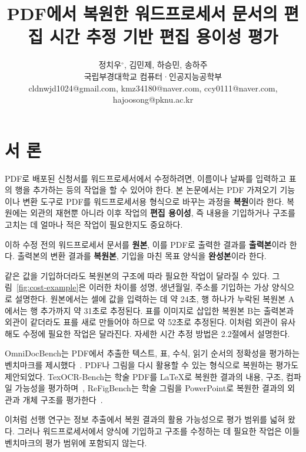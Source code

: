 \documentclass{kcc}
\title{PDF에서 복원한 워드프로세서 문서의 편집 시간 추정 기반 편집 용이성 평가}
\author{
정치우$^{\circ}$, 김민제, 하승민, 송하주\\
국립부경대학교 컴퓨터·인공지능공학부\\
cldnwjd1024@gmail.com, kmz34180@naver.com, ccy0111@naver.com, hajoosong@pknu.ac.kr
}
\begin{document}
\maketitle
\makeatletter
\if@preprint\else
\begingroup
\renewcommand{\thefootnote}{}
\long{}
\endgroup
\fi
\makeatother

\section{서 론}

PDF로 배포된 신청서를 워드프로세서에서 수정하려면, 이름이나 날짜를 입력하고 표의 행을 추가하는 등의 작업을 할 수 있어야 한다.
본 논문에서는 PDF 가져오기 기능이나 변환 도구로 PDF를 워드프로세서용 형식으로 바꾸는 과정을 \textbf{복원}이라 한다.
복원에는 외관의 재현뿐 아니라 이후 작업의 \textbf{편집 용이성}, 즉 내용을 기입하거나 구조를 고치는 데 얼마나 적은 작업이 필요한지도 중요하다.

이하 수정 전의 워드프로세서 문서를 \textbf{원본}, 이를 PDF로 출력한 결과를 \textbf{출력본}이라 한다.
출력본의 변환 결과를 \textbf{복원본}, 기입을 마친 목표 양식을 \textbf{완성본}이라 한다.

같은 값을 기입하더라도 복원본의 구조에 따라 필요한 작업이 달라질 수 있다.
그림~\ref{fig:cost-example}은 이러한 차이를 성명, 생년월일, 주소를 기입하는 가상 양식으로 설명한다.
원본에서는 셀에 값을 입력하는 데 약 24초, 행 하나가 누락된 복원본 A에서는 행 추가까지 약 31초로 추정된다.
표를 이미지로 삽입한 복원본 B는 출력본과 외관이 같더라도 표를 새로 만들어야 하므로 약 52초로 추정된다.
이처럼 외관이 유사해도 수정에 필요한 작업은 달라진다.
자세한 시간 추정 방법은 2.2절에서 설명한다.

{\setlength{\intextsep}{6pt plus 2pt minus 2pt}}

OmniDocBench는 PDF에서 추출한 텍스트, 표, 수식, 읽기 순서의 정확성을 평가하는 벤치마크를 제시했다~\cite{ouyang2025omnidocbench}.
PDF나 그림을 다시 활용할 수 있는 형식으로 복원하는 평가도 제안되었다.
TexOCR-Bench는 학술 PDF를 LaTeX로 복원한 결과의 내용, 구조, 컴파일 가능성을 평가하며~\cite{wang2026texocr}, ReFigBench는 학술 그림을 PowerPoint로 복원한 결과의 외관과 개체 구조를 평가한다~\cite{fan2026refigbench}.

이처럼 선행 연구는 정보 추출에서 복원 결과의 활용 가능성으로 평가 범위를 넓혀 왔다.
그러나 워드프로세서에서 양식에 기입하고 구조를 수정하는 데 필요한 작업은 이들 벤치마크의 평가 범위에 포함되지 않는다.
\end{document}
